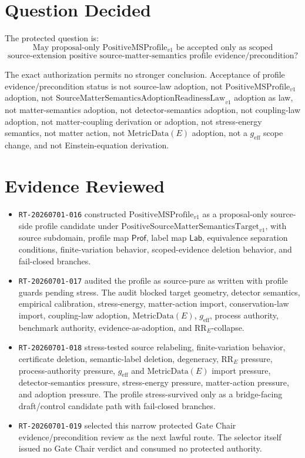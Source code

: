 \documentclass[11pt]{article}
\newcommand{\PositiveMSProfile}{\mathrm{PositiveMSProfile}_{v1}}
\newcommand{\PositiveTarget}{\mathrm{PositiveSourceMatterSemanticsTarget}_{v1}}
\newcommand{\SMSAR}{\mathrm{SourceMatterSemanticsAdoptionReadinessLaw}_{v1}}
\newcommand{\Prof}{\mathsf{Prof}}
\newcommand{\Lab}{\mathsf{Lab}}
\newcommand{\MetricData}{\mathrm{MetricData}}
\newcommand{\geff}{g_{\mathrm{eff}}}
\begin{document}
\section{Question Decided}

The protected question is:
\[
\text{May proposal-only } \PositiveMSProfile \text{ be accepted only as scoped}
\]
\[
\text{source-extension positive source-matter-semantics profile evidence/precondition?}
\]

The exact authorization permits no stronger conclusion. Acceptance of profile
evidence/precondition status is not source-law adoption, not
\(\PositiveMSProfile\) adoption, not \(\SMSAR\) adoption as law, not
matter-semantics adoption, not detector-semantics adoption, not coupling-law
adoption, not matter-coupling derivation or adoption, not stress-energy
semantics, not matter action, not \(\MetricData(E)\) adoption, not a
\(\geff\) scope change, and not Einstein-equation derivation.

\section{Evidence Reviewed}

\begin{itemize}[leftmargin=*]
  \item \texttt{RT-20260701-016} constructed \(\PositiveMSProfile\) as a
  proposal-only source-side profile candidate under \(\PositiveTarget\), with
  source subdomain, profile map \(\Prof\), label map \(\Lab\), equivalence
  separation conditions, finite-variation behavior, scoped-evidence deletion
  behavior, and fail-closed branches.
  \item \texttt{RT-20260701-017} audited the profile as source-pure as
  written with profile guards pending stress. The audit blocked target
  geometry, detector semantics, empirical calibration, stress-energy,
  matter-action import, conservation-law import, coupling-law adoption,
  \(\MetricData(E)\), \(\geff\), process authority, benchmark authority,
  evidence-as-adoption, and \(\mathrm{RR}_E\)-collapse.
  \item \texttt{RT-20260701-018} stress-tested source relabeling,
  finite-variation behavior, certificate deletion, semantic-label deletion,
  degeneracy, \(\mathrm{RR}_E\) pressure, process-authority pressure,
  \(\geff\) and \(\MetricData(E)\) import pressure, detector-semantics
  pressure, stress-energy pressure, matter-action pressure, and adoption
  pressure. The profile stress-survived only as a bridge-facing draft/control
  candidate path with fail-closed branches.
  \item \texttt{RT-20260701-019} selected this narrow protected Gate Chair
  evidence/precondition review as the next lawful route. The selector itself
  issued no Gate Chair verdict and consumed no protected authority.
\end{itemize}
\end{document}
